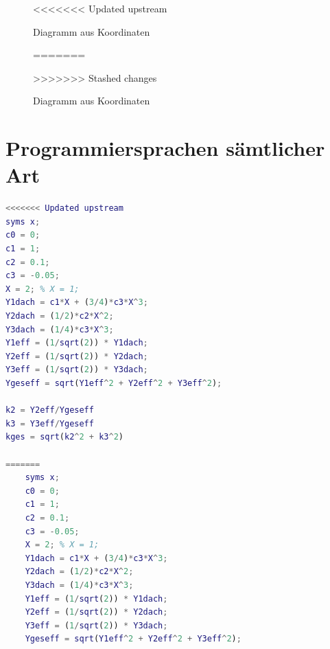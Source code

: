 \documentclass[
12pt,
a4paper,
headings=small,                    %
bibliography=totoc,                %
listof=totoc,                      %
parskip=half*,                     %
]{scrartcl}                        %
\begin{document}
\begin{table}[H]
\resetlaborsectioncounter
{}
\begin{figure}[H]
<<<<<<< Updated upstream
    \centering
    \caption{Diagramm aus Koordinaten}
    \label{fig:2_2_diagramm}
=======
	\centering
	\caption{Diagramm aus Koordinaten}
	\label{fig:2_2_diagramm}
>>>>>>> Stashed changes
\end{figure}


\newpage
\section{Programmiersprachen sämtlicher Art}
\begin{lstlisting}[language=matlab]
<<<<<<< Updated upstream
syms x;
c0 = 0;
c1 = 1;
c2 = 0.1;
c3 = -0.05;
X = 2; % X = 1;
Y1dach = c1*X + (3/4)*c3*X^3;
Y2dach = (1/2)*c2*X^2;
Y3dach = (1/4)*c3*X^3;
Y1eff = (1/sqrt(2)) * Y1dach;
Y2eff = (1/sqrt(2)) * Y2dach;
Y3eff = (1/sqrt(2)) * Y3dach;
Ygeseff = sqrt(Y1eff^2 + Y2eff^2 + Y3eff^2);

k2 = Y2eff/Ygeseff
k3 = Y3eff/Ygeseff
kges = sqrt(k2^2 + k3^2)

=======
	syms x;
	c0 = 0;
	c1 = 1;
	c2 = 0.1;
	c3 = -0.05;
	X = 2; % X = 1;
	Y1dach = c1*X + (3/4)*c3*X^3;
	Y2dach = (1/2)*c2*X^2;
	Y3dach = (1/4)*c3*X^3;
	Y1eff = (1/sqrt(2)) * Y1dach;
	Y2eff = (1/sqrt(2)) * Y2dach;
	Y3eff = (1/sqrt(2)) * Y3dach;
	Ygeseff = sqrt(Y1eff^2 + Y2eff^2 + Y3eff^2);
	

\end{lstlisting}
\end{table}
\end{document}

